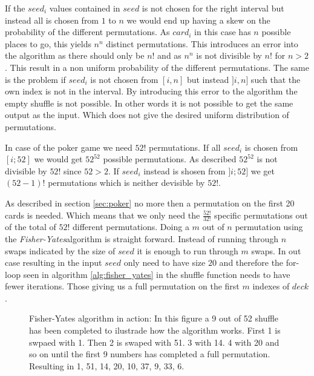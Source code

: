 \documentclass[twoside,11pt,openright]{report}
\newcommand{\FY}{\textit{Fisher-Yates}}
\begin{document}
If the $seed_i$ values contained in $seed$ is not chosen for the right interval but instead all is chosen from $1$ to $n$ we would end up having a skew on the probability of the different permutations. As $card_i$ in this case has $n$ possible places to go, this yields $n^n$ distinct permutations. This introduces an error into the algorithm as there should only be $n!$ and as $n^n$ is not divisible by $n!$ for $n>2$. This result in a non uniform probability of the different permutations. The same is the problem if $seed_i$ is not chosen from $[i,n]$ but instead $]i,n]$ such that the own index is not in the interval. By introducing this error to the algorithm the empty shuffle is not possible. In other words it is not possible to get the same output as the input. Which does not give the desired uniform distribution of permutations.

\bigskip

In case of the poker game we need $52!$ permutations. If all $seed_i$ is chosen from $[i;52]$ we would get $52^{52}$ possible permutations. As described $52^{52}$ is not divisible by $52!$ since $52>2$. If $seed_i$ instead is shosen from $]i;52]$ we get $(52-1)!$ permutations which is neither devisible by $52!$.

\bigskip

As described in section \ref{sec:poker} no more then a permutation on the first 20 cards is needed. Which means that we only need the $\frac{52!}{32!}$ specific permutations out of the total of $52!$ different permutations. Doing a $m$ out of $n$ permutation using the \FY algorithm is straight forward. Instead of running through $n$ swaps indicated by the size of $seed$ it is enough to run through $m$ swaps. In out case resulting in the input $seed$ only need to have size $20$ and therefore the for-loop seen in algorithm \ref{alg:fisher_yates} in the shuffle function needs to have fewer iterations. Those giving us a full permutation on the first $m$ indexes of $deck$.

\bigskip

\begin{figure}
\centering
\scalebox{1.5}{}
\caption{Fisher-Yates algorithm in action: In this figure a 9 out of 52 shuffle has been completed to ilustrade how the algorithm works. First 1 is swpaed with 1. Then 2 is swaped with 51. 3 with 14. 4 with 20 and so on until the first 9 numbers has completed a full permutation. Resulting in 1, 51, 14, 20, 10, 37, 9, 33, 6.}
\label{fig:fisher_yates}
\end{figure}
\end{document}
